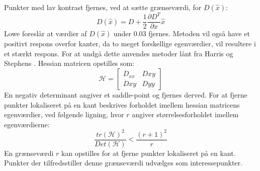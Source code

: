 \\
Punkter med lav kontrast fjernes, ved at sætte grænseværdi, for $D(\hat{x})$:
\begin{equation}
D(\hat{x})=D+\dfrac{1}{2}\dfrac{\partial D^T}{\partial x}\hat{x}
\label{dxhat}
\end{equation}
Lowe foreslår at værdier af $D(\hat{x})$ under 0.03 fjernes. Metoden vil også have et positivt respons overfor kanter, da to meget forskellige egenværdier, vil resultere i et stærkt respons.
For at undgå dette anvendes metoder lånt fra Harris og Stephens \cite{harris}. Hessian matricen opstilles som:
\begin{equation}
\mathcal{H} =
\begin{bmatrix}
D_{xx} & D{xy} \\
D{xy} & D{yy}
\end{bmatrix}
\end{equation}
En negativ determinant angiver et saddle-point og fjernes derved. For at fjerne punkter lokaliseret på en kant beskrives forholdet imellem hessian matricens egenværdier, ved følgende ligning, hvor $r$ angiver størrelsesforholdet imellem egenværdierne:
\begin{equation}
\dfrac{tr(\mathcal{H})^2}{Det(\mathcal{H})}<\dfrac{(r+1)^2}{r}
\label{rval}
\end{equation}
En grænseværdi $r$ kan opstilles for at fjerne punkter lokaliseret på en kant. Punkter der tilfredsstiller denne grænseværdi udvælges som interessepunkter.
